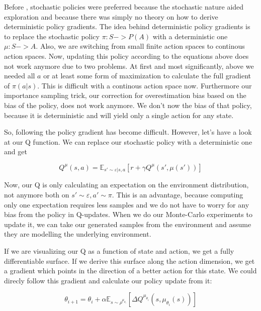 \documentclass[hyperref,beleg]{cgvpub}
\begin{document}
Before \cite{silverDeterministicPolicyGradient2013}, stochastic policies were preferred because the stochastic nature aided exploration and because there was simply no theory on how to derive deterministic policy gradients. The idea behind deterministic policy gradients is to replace the stochastic policy $\pi: S -> P(A)$ with a deterministic one $\mu: S -> A$. Also, we are switching from small finite action spaces to continous action spaces. Now, updating this policy according to the equations above does not work anymore due to two problems. At first and most significantly, above we needed all $a$ or at least some form of maximization to calculate the full gradient of $\pi(a|s)$. This is difficult with a continous action space now. Furthermore our importance sampling trick, our correction for overestimation bias based on the bias of the policy, does not work anymore. We don't now the bias of that policy, because it is deterministic and will yield only a single action for any state. 

So, following the policy gradient has become difficult. However, let's have a look at our Q function. We can replace our stochastic policy with a deterministic one and get

\begin{equation}
Q^{\mu}(s,a) = \mathbb{E}_{s' \sim \varepsilon | s,a}[r + \gamma Q^{\mu}(s', \mu(s'))]
\end{equation}

Now, our Q is only calculating an expectation on the environment distribution, not anymore both on $s' \sim \varepsilon, a' \sim \pi$. This is an advantage, because computing only one expectation requires less samples and we do not have to worry for any bias from the policy in Q-updates. When we do our Monte-Carlo experiments to update it, we can take our generated samples from the environment and assume they are modelling the underlying environment.

If we are visualizing our Q as a function of state and action, we get a fully differentiable surface. If we derive this surface along the action dimension, we get a gradient which points in the direction of a better action for this state. We could direcly follow this gradient and calculate our policy update from it:

\begin{equation}
\theta_{i+1} = \theta_i + \alpha \mathbb{E}_{s \sim \rho^{\mu_{\theta_i}}}[\Delta Q^{\mu_{\theta_i}}(s, \mu_{\theta_i}(s))]
\end{equation}
\end{document}
